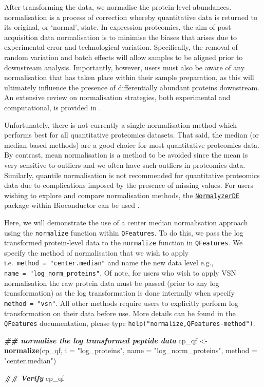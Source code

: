 \documentclass[9pt,a4paper,]{extarticle}
\newenvironment{Shaded}{\begin{snugshade}}{\end{snugshade}}
\newcommand{\AttributeTok}[1]{\textcolor[rgb]{0.13,0.29,0.53}{#1}}
\newcommand{\DocumentationTok}[1]{\textcolor[rgb]{0.56,0.35,0.01}{\textbf{\textit{#1}}}}
\newcommand{\FunctionTok}[1]{\textcolor[rgb]{0.13,0.29,0.53}{\textbf{#1}}}
\newcommand{\NormalTok}[1]{#1}
\newcommand{\OtherTok}[1]{\textcolor[rgb]{0.56,0.35,0.01}{#1}}
\newcommand{\StringTok}[1]{\textcolor[rgb]{0.31,0.60,0.02}{#1}}
\begin{document}
After transforming the data, we normalise the protein-level abundances.
normalisation is a process of correction whereby quantitative data is returned
to its original, or `normal', state. In expression proteomics, the aim of
post-acquisition data normalisation is to minimise the biases that arises due to
experimental error and technological variation. Specifically, the removal of
random variation and batch effects will allow samples to be aligned prior to
downstream analysis. Importantly, however, users must also be aware of any
normalisation that has taken place within their sample preparation, as this will
ultimately influence the presence of differentially abundant proteins
downstream. An extensive review on normalisation strategies, both experimental
and computational, is provided in \citep{ORourke2019}.

Unfortunately, there is not currently a single normalisation method which
performs best for all quantitative proteomics datasets. That said, the median
(or median-based methods) are a good choice for most quantitative proteomics data.
By contrast, mean normalisation is a method to be avoided since the mean is very
sensitive to outliers and we often have such outliers in proteomics data.
Similarly, quantile normalisation is not recommended for quantitative proteomics
data due to complications imposed by the presence of missing values. For users
wishing to explore and compare normalisation methods, the \href{https://www.bioconductor.org/packages/release/bioc/html/NormalyzerDE.html}{\texttt{NormalyzerDE}}
package within Bioconductor can be used \citep{Willforss2018}.

Here, we will demonstrate the use of a center median normalisation approach using
the \texttt{normalize} function within \texttt{QFeatures}. To do this, we pass the log transformed
protein-level data to the \texttt{normalize} function in \texttt{QFeatures}. We specify the
method of normalisation that we wish to apply i.e.~\texttt{method\ =\ "center.median"} and
name the new data level e.g., \texttt{name\ =\ "log\_norm\_proteins"}. Of note, for users who
wish to apply VSN normalisation the raw protein data must be passed (prior to any
log transformation) as the log transformation is done internally when specify
\texttt{method\ =\ "vsn"}. All other methods require users to explicitly perform log
transformation on their data before use. More details can be found in the
\texttt{QFeatures} documentation, please type \texttt{help("normalize,QFeatures-method")}.

\begin{Shaded}
\begin{Highlighting}[]
\DocumentationTok{\#\# normalise the log transformed peptide data}
\NormalTok{cp\_qf }\OtherTok{\textless{}{-}} \FunctionTok{normalize}\NormalTok{(cp\_qf,}
                   \AttributeTok{i =} \StringTok{"log\_proteins"}\NormalTok{,}
                   \AttributeTok{name =} \StringTok{"log\_norm\_proteins"}\NormalTok{,}
                   \AttributeTok{method =} \StringTok{"center.median"}\NormalTok{)}

\DocumentationTok{\#\# Verify}
\NormalTok{cp\_qf}
\end{Highlighting}
\end{Shaded}
\end{document}

